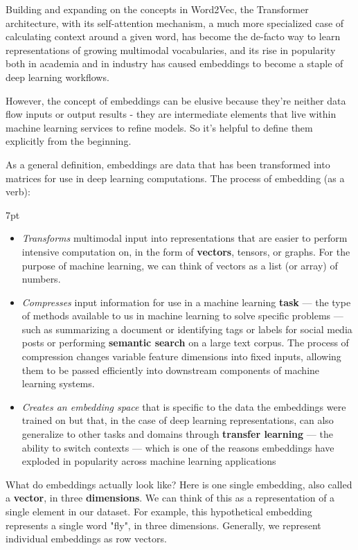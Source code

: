 \documentclass[11pt, table]{diazessay} %
\newenvironment{formal}{%
  \def\FrameCommand{%
	\hspace{1pt}%
	{\color{w_lightblue}\vrule width 2pt}%
	{\color{formalshade}\vrule width 4pt}%
	\colorbox{formalshade}%
  }%
  \MakeFramed{\advance\hsize-\width\FrameRestore}%
  \noindent\hspace{-4.55pt}%
  \begin{adjustwidth}{}{7pt}%
  \vspace{2pt}\vspace{2pt}%
}
{%
  \vspace{2pt}\end{adjustwidth}\endMakeFramed%
}
\begin{document}
\begin{sloppypar}
Building and expanding on the concepts in Word2Vec, the Transformer \citep{vaswani2017attention} architecture, with its self-attention mechanism, a much more specialized case of calculating context around a given word, has become the de-facto way to learn representations of growing multimodal vocabularies, and its rise in popularity both in academia and in industry has caused embeddings to become a staple of deep learning workflows.

However, the concept of embeddings can be elusive because they're neither data flow inputs or output results - they are intermediate elements that live within machine learning services to refine models. So it's helpful to define them explicitly from the beginning.


As a general definition, embeddings are data that has been transformed into matrices for use in deep learning computations. The process of embedding (as a verb):  
\begin{formal}
\begin{itemize}
   \item \emph{Transforms} multimodal input into representations that are easier to perform intensive computation on, in the form of \textbf{vectors}, tensors, or graphs\citep{rao2019natural}. For the purpose of machine learning, we can think of vectors as a list (or array) of numbers.
  \item \emph{Compresses} input information for use in a machine learning \textbf{task} --- the type of methods available to us in machine learning to solve specific problems --- such as summarizing a document or identifying tags or labels for social media posts or performing \textbf{semantic search} on a large text corpus. The process of compression changes variable feature dimensions into fixed inputs, allowing them to be passed efficiently into downstream components of machine learning systems.
  \item \emph{Creates an embedding space} that is specific to the data the embeddings were trained on but that, in the case of deep learning representations, can also generalize to other tasks and domains through \textbf{transfer learning} --- the ability to switch contexts --- which is one of the reasons embeddings have exploded in popularity across machine learning applications
\end{itemize}
\end{formal}

What do embeddings actually look like? Here is one single embedding, also called a \textbf{vector}, in three \textbf{dimensions}. We can think of this as a representation of a single element in our dataset. For example, this hypothetical embedding represents a single word "fly", in three dimensions.  Generally, we represent individual embeddings as row vectors.


\end{sloppypar}
\end{document}

